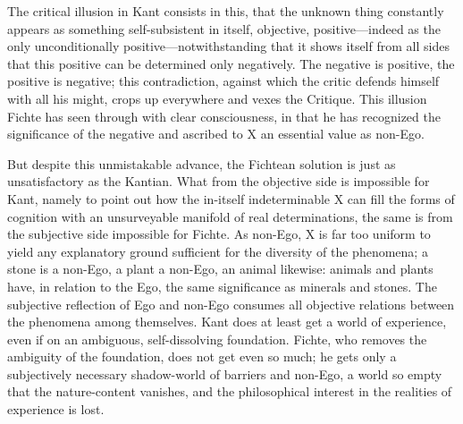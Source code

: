 \documentclass[12pt]{article}
\begin{document}
The critical illusion in Kant consists in this, that the unknown thing
constantly appears as something self-subsistent in itself, objective,
positive—indeed as the only unconditionally positive—notwithstanding that
it shows itself from all sides that this positive can be determined only
negatively. The negative is positive, the positive is negative; this
contradiction, against which the critic defends himself with all his might,
crops up everywhere and vexes the Critique. This illusion Fichte has seen
through with clear consciousness, in that he has recognized the
significance of the negative and ascribed to X an essential value as
non-Ego.

But despite this unmistakable advance, the Fichtean solution is just as
unsatisfactory as the Kantian. What from the objective side is impossible
for Kant, namely to point out how the in-itself indeterminable X can fill
the forms of cognition with an unsurveyable manifold of real
determinations, the same is from the subjective side impossible for Fichte.
As non-Ego, X is far too uniform to yield any explanatory ground sufficient
for the diversity of the phenomena; a stone is a non-Ego, a plant a
non-Ego, an animal likewise: animals and plants have, in relation to the
Ego, the same significance as minerals and stones. The subjective
reflection of Ego and non-Ego consumes all objective relations between the
phenomena among themselves. Kant does at least get a world of experience,
even if on an ambiguous, self-dissolving foundation. Fichte, who removes
the ambiguity of the foundation, does not get even so much; he gets only a
subjectively necessary shadow-world of barriers and non-Ego, a world so
empty that the nature-content vanishes, and the philosophical interest in
the realities of experience is lost.
\end{document}
